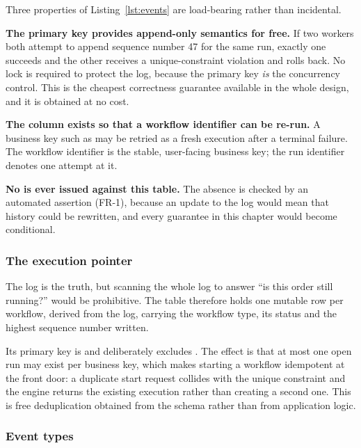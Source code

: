 Three properties of Listing~\ref{lst:events} are load-bearing rather than
incidental.

\textbf{The primary key provides append-only semantics for free.} If two
workers both attempt to append sequence number 47 for the same run, exactly
one succeeds and the other receives a unique-constraint violation and rolls
back. No lock is required to protect the log, because the primary key
\emph{is} the concurrency control. This is the cheapest correctness guarantee
available in the whole design, and it is obtained at no cost.

\textbf{The  column exists so that a workflow identifier can be
re-run.} A business key such as  may be retried as a fresh
execution after a terminal failure. The workflow identifier is the stable,
user-facing business key; the run identifier denotes one attempt at it.

\textbf{No  is ever issued against this table.} The absence is
checked by an automated assertion (FR-1), because an update to the log would
mean that history could be rewritten, and every guarantee in this chapter
would become conditional.

\subsubsection{The execution pointer}

The log is the truth, but scanning the whole log to answer ``is this order
still running?'' would be prohibitive. The  table therefore
holds one mutable row per workflow, derived from the log, carrying the
workflow type, its status and the highest sequence number written.

Its primary key is  and deliberately excludes
. The effect is that at most one open run may exist per business
key, which makes starting a workflow idempotent at the front door: a duplicate
start request collides with the unique constraint and the engine returns the
existing execution rather than creating a second one. This is free
deduplication obtained from the schema rather than from application logic.

\subsubsection{Event types}

